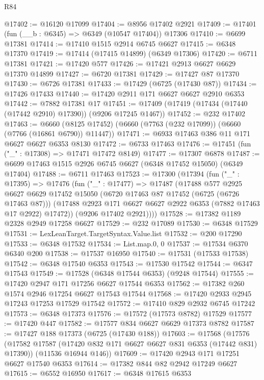 \begin{lexlean}{R84}
\begin{coremodule}
@17402 := @16120 @17099
@17404 := @8956 @17402 @2921
@17409 := @17401 (fun (__b : @6345) => @6349 (@10547 @17404)) @17306
@17410 := @6699 @17381
@17414 := @17410 @1515 @2914 @6745 @6627
@17415 := @6348 @17370
@17419 := @17414 (@17415 @14899) (@6349 @17306)
@17420 := @6711 @17381
@17421 := @17420 @577
@17426 := @17421 @2913 @6627 @6629 @17370 @14899
@17427 := @6720 @17381
@17429 := @17427 @87 @17370
@17430 := @6726 @17381
@17433 := @17429 (@6725 (@17430 @87))
@17434 := @17426 @17433
@17440 := @17420 @2911 @171 @6627 @6627 @2910 @6353
@17442 := @7882 @17381 @17
@17451 := @17409 (@17419 (@17434 (@17440 (@17442 @2910) @17390)) (@9206 @17245 @1467))
@17452 := @232 @17402
@17463 := @6660 (@8125 @17452) (@6660 (@7763 (@232 @17099)) (@6660 (@7766 (@16861 @6790)) @11447))
@17471 := @6933 @17463 @386 @11 @171 @6627 @6627 @6353 @8130
@17472 := @6733 @17463
@17476 := @17451 (fun ("_" : @17308) => @17471 @17472 @8149)
@17477 := @17307 @6878
@17487 := @6699 @17463 @1515 @2926 @6745 @6627 (@6348 @17452 @15050) (@6349 @17404)
@17488 := @6711 @17463
@17523 := @17300
    (@17394
      (fun ("_" : @17395) =>
      @17476
        (fun ("_" : @17477) =>
        @17487
          (@17488
            @577
            @2925
            @6627
            @6629
            @17452
            @15050
            (@6720 @17463 @87 @17452 (@6725 (@6726 @17463 @87)))
            (@17488 @2923 @171 @6627 @6627 @2922 @6353 (@7882 @17463 @17 @2922) @17472))
          (@9206 @17402 @2921))))
@17528 := @17382 @1189 @2328 @2949 @17258 @6627
@17529 := @232 @17089
@17530 := @6348 @17529
@17531 := LexLeanTarget.TargetSyntax.Value.list
@17532 := @200 @17290
@17533 := @6348 @17532
@17534 := List.map.{0, 0}
@17537 := @17534 @6370 @6340 @200
@17538 := @17537 @16950
@17540 := @17531 (@17533 @17538)
@17542 := @6348 @17540 @6353
@17543 := @17530 @17542
@17544 := @6347 @17543
@17549 := @17528 (@6348 @17544 @6353) (@9248 @17544)
@17555 := @17420 @2947 @171 @17256 @6627 @17544 @6353
@17562 := @17382 @260 @1574 @2946 @17254 @6627 @17543 @17544
@17568 := @17420 @2933 @2945 @17243 @17253 @17529 @17542
@17572 := @17410 @829 @2932 @6745 @17242
@17573 := @6348 @17373
@17576 := @17572 (@17573 @8782) @17529
@17577 := @17420 @447
@17582 := @17577 @834 @6627 @6629 @17373 @8782
@17587 := @17427 @188 @17373 (@6725 (@17430 @188))
@17603 := @17568
    (@17576
      (@17582 @17587 (@17420 @832 @171 @6627 @6627 @831 @6353 (@17442 @831) @17390))
      (@11536 @16944 @146))
@17609 := @17420 @2943 @171 @17251 @6627 @17540 @6353
@17614 := @17382 @844 @82 @2942 @17249 @6627
@17615 := @6552 @16950
@17617 := @6348 @17615 @6353

\end{coremodule}
\end{lexlean}
